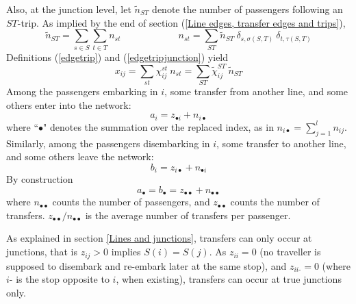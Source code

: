 \documentclass{llncs}
\begin{document}
Also, 
at the junction level, let $\tilde{n}_{ST}$ denote the number of passengers following an $ST$-trip. As implied by the end of section (\ref{Line edges, transfer edges and trips}), 
\begin{equation}
\label{equivnntilde}
\tilde{n}_{ST}=\sum_{s\in S}\sum_{t\in T}n_{st} \qquad\qquad\qquad n_{st}=\sum_{ST}\tilde{n}_{ST}\: \delta_{s,\sigma(S,T)}\: \delta_{t,\tau(S,T)}
\end{equation}
Definitions (\ref{edgetrip}) and (\ref{edgetripjunction}) yield
\begin{equation}
\label{equationGG}
x_{ij}=\sum_{st}\chi_{ij}^{st}\:  n_{st}=\sum_{ST}\tilde{\chi}_{ij}^{ST}\:  \tilde{n}_{ST}
\end{equation}
Among the passengers embarking in $i$, some transfer from another line, and some others enter into the network: 
\begin{equation}
\label{entrer}
a_i=z_{\bullet i}+n_{i\bullet}
\end{equation}
where  ``$\bullet$" denotes the summation over the replaced index, as in $n_{i\bullet}=\sum_{j=1}^l n_{ij}$. Similarly, among the passengers disembarking in $i$, some transfer to another line, and some others leave the network: 
\begin{equation}
\label{sortir}
b_i=z_{i\bullet}+n_{\bullet i}
\end{equation}
By construction
\begin{displaymath}
a_{\bullet}=b_{\bullet}=z_{\bullet\bullet}+n_{\bullet\bullet}
\end{displaymath}
where $n_{\bullet\bullet}$ counts the number of passengers, and $z_{\bullet\bullet}$ counts the number of transfers. $z_{\bullet\bullet}/n_{\bullet\bullet}$  is the average number of transfers per passenger. 

\vspace*{0.1cm}



As explained in section \ref{Lines and junctions}, transfers can only occur at junctions, that is $z_{ij}>0$ implies $S(i)=S(j)$. As $z_{ii}=0$ (no traveller is supposed to disembark and re-embark later at the same stop), and $z_{ii\text{-}}=0$ (where $i\text{-}$ is the stop opposite to $i$, when existing), transfers can occur at true junctions only. 

\vspace*{0.1cm}
\end{document}
